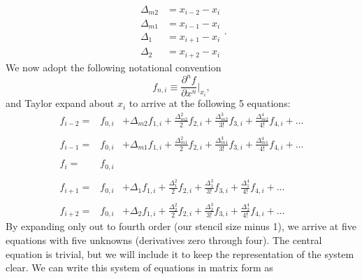 \documentclass[12pt,letterpaper]{article}
\def\dfz{f_{0,i}}
\def\df{f_{1,i}}
\def\ddf{f_{2,i}}
\def\dddf{f_{3,i}}
\def\ddddf{f_{4,i}}
\def\dmm{\Delta_{m2}}
\def\dm{\Delta_{m1}}
\def\dpl{\Delta_{1}}
\def\dpp{\Delta_{2}}
\begin{document}
\begin{equation}
\begin{array}{cc}
\Delta_{m2} &= x_{i-2}-x_i \\
\Delta_{m1} &= x_{i-1}-x_i \\
\Delta_{1}  &= x_{i+1}-x_i \\
\Delta_{2}  &= x_{i+2}-x_i 
\end{array}.
\end{equation}
We now adopt the following notational convention
\begin{equation}
f_{n,i} \equiv \frac{\partial^n f}{\partial x^n}|_{x_i},
\end{equation}
and Taylor expand about $x_i$ to arrive at the following 5 equations:
\begin{equation}
\begin{array}{ccc}
f_{i-2} = & \dfz & +  \dmm\df+\frac{\dmm^2}{2}\ddf+\frac{\dmm^3}{3!}\dddf+ \frac{\dmm^4}{4!}\ddddf+...\\
\\
f_{i-1} = & \dfz & +  \dm\df+\frac{\dm^2}{2}\ddf+\frac{\dm^3}{3!}\dddf+ \frac{\dm^4}{4!}\ddddf +...\\
\\
 f_{i}  = & \dfz & \\
\\
f_{i+1} = & \dfz & +  \dpl\df+\frac{\dpl^2}{2}\ddf+\frac{\dpl^3}{3!}\dddf+ \frac{\dpl^4}{4!}\ddddf +...\\
\\
f_{i+2} = & \dfz & +   \dpp\df+\frac{\dpp^2}{2}\ddf+\frac{\dpp^3}{3!}\dddf+ \frac{\dpp^4}{4!}\ddddf +...
\end{array}
\end{equation}
By expanding only out to fourth order (our stencil size minus 1), we arrive at five equations with five unknowns (derivatives zero through four).  The central equation is trivial, but we will include it to keep the representation of the system clear.  We can write this system of equations in matrix form as
\end{document}

